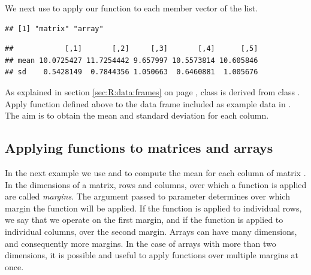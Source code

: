 \documentclass[krantz2]{krantz}\usepackage{knitr}
\begin{document}
\begin{explainbox}
We next use  to apply our function to each member vector of the list.

\begin{knitrout}\footnotesize
{}\color{fgcolor}\begin{kframe}
\begin{alltt}
 \hlkwb{<-} \hlstd{(} 
                  
                  \hlstd{=} \hlstd{(} \hlstd{=} \hlstd{,}  \hlstd{=} \hlstd{),}
                  \hlstd{=} \hlstd{)}
\end{alltt}
\begin{verbatim}
## [1] "matrix" "array"
\end{verbatim}
\begin{alltt}
\end{alltt}
\begin{verbatim}
##            [,1]       [,2]     [,3]       [,4]      [,5]
## mean 10.0725427 11.7254442 9.657997 10.5573814 10.605846
## sd    0.5428149  0.7844356 1.050663  0.6460881  1.005676
\end{verbatim}
\end{kframe}
\end{knitrout}
\end{explainbox}

\begin{playground}
As explained in section \ref{sec:R:data:frames} on page \pageref{sec:R:data:frames}, class  is derived from class . Apply function  defined above to the data frame  included as example data in \Rlang. The aim is to obtain the mean and standard deviation for each column.
\end{playground}

\subsection{Applying functions to matrices and arrays}
In the next example we use  and  to compute the mean for each column of matrix . In \Rlang the dimensions of a matrix, rows and columns, over which a function is applied are called \emph{margins}. The argument passed to parameter  determines over which margin the function will be applied. If the function is applied to individual rows, we say that we operate on the first margin, and if the function is applied to individual columns, over the second margin. Arrays can have many dimensions, and consequently more margins. In the case of arrays with more than two dimensions, it is possible and useful to apply functions over multiple margins at once.
\end{document}
